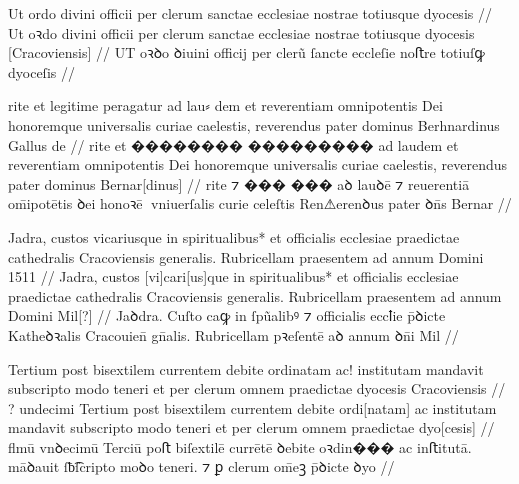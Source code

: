 


\ex \bg
\gla
{}
Ut ordo divini officii per clerum sanctae ecclesiae  nostrae totiusque 
dyocesis {}
//
\glRekonstrukcja
{}
Ut oꝛdo divini officii per clerum sanctae ecclesiae {} nostrae  totiusque 
dyocesis [Cracoviensis]
//
\glU
{}
UT oꝛꝺo ꝺiuini officij per clerũ ſancte eccleſie {} noﬅre  totiuſꝙ
dyoceſis {}
//
\endgl
\xe

\ex \bg
\gla
{}
rite et legitime peragatur ad {lau⸗  dem} et reverentiam 
omnipotentis Dei honoremque universalis curiae caelestis, reverendus 
pater dominus Berhnardinus Gallus de
//
\glRekonstrukcja
{}
rite et {��������} {���������} ad laudem et reverentiam 
omnipotentis Dei honoremque universalis curiae caelestis, reverendus 
pater dominus Bernar[dinus] {} {}
//
\glU
{}
rite ⁊ {���} {���} aꝺ lauꝺē ⁊ reuerentiā om̄ipotētis ꝺei honoꝛē vniuerſalis curie celeſtis Ren⚠erenꝺus pater ꝺn̄s Bernar
//
\endgl
\xe


\ex \bg
\gla
{}
Jadra, custos vicariusque  in spiritualibus* et officialis ecclesiae praedictae cathedralis Cracoviensis 
generalis.
Rubricellam  praesentem ad annum Domini 1511
//
\glRekonstrukcja
{}
Jadra, custos [vi]cari[us]que {} in spiritualibus* et officialis ecclesiae praedictae cathedralis Cracoviensis 
generalis.
Rubricellam  praesentem ad annum Domini Mil[?]
//
\glU
{}
Jaꝺdra. Cuſto caꝙ
{} in ſpũalibꝰ ⁊ oﬀicialis eccꝉie p̄ꝺicte Katheꝺꝛalis Cracouien̄ gn̄alis. Rubricellam  pꝛeſentē aꝺ annum ꝺn̄i Mil
//
\endgl
\xe


\ex \bg
\gla
{}
{} {}  Tertium 
post bisextilem  currentem debite ordinatam ac! institutam mandavit 
subscripto modo teneri et per clerum omnem praedictae dyocesis Cracoviensis
{}
//
\glRekonstrukcja
{}
{?} undecimi  Tertium 
post bisextilem {} currentem debite ordi[natam] ac institutam mandavit 
subscripto modo teneri et per clerum omnem praedictae dyo[cesis]
{}
//
\glU
{}
ﬂmū vnꝺecimū  Terciū poﬅ biſextilē {} currētē ꝺebite oꝛdin��� ac inﬅitutā. māꝺauit ſƀ͡ſcripto moꝺo teneri. ⁊ ꝑ  clerum om̄eꝫ p̄ꝺicte ꝺyo
{}
//
\endgl
\xe



